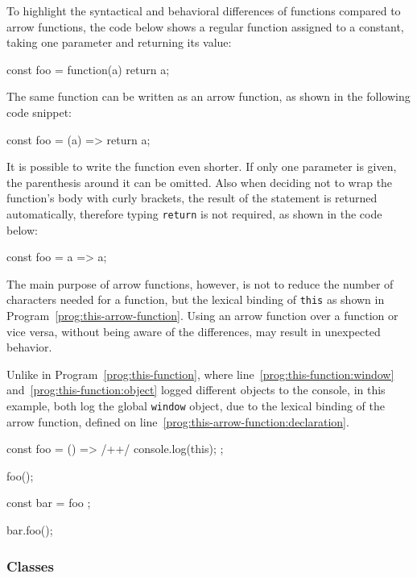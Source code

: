 To highlight the syntactical and behavioral differences of functions compared to arrow functions, the code below shows a regular function assigned to a constant, taking one parameter and returning its value:
\begin{JsCode}[numbers=none]
const foo = function(a) {
  return a;
}
\end{JsCode}
The same function can be written as an arrow function, as shown in the following code snippet:
\begin{JsCode}[numbers=none]
const foo = (a) => {
  return a;
}
\end{JsCode}
It is possible to write the function even shorter. If only one parameter is given, the parenthesis around it can be omitted. Also when deciding not to wrap the function's body with curly brackets, the result of the statement is returned automatically, therefore typing \texttt{return} is not required, as shown in the code below:
\begin{JsCode}[numbers=none]
const foo = a => a;
\end{JsCode}
The main purpose of arrow functions, however, is not to reduce the number of characters needed for a function, but the lexical binding of \texttt{this} as shown in Program~\ref{prog:this-arrow-function}. Using an arrow function over a function or vice versa, without being aware of the differences, may result in unexpected behavior.
\begin{program}
\caption{Unlike in Program~\ref{prog:this-function}, where line~\ref{prog:this-function:window} and~\ref{prog:this-function:object} logged different objects to the console, in this example, both log the global \texttt{window} object, due to the lexical binding of the arrow function, defined on line~\ref{prog:this-arrow-function:declaration}.}
\label{prog:this-arrow-function}
\begin{JsCode}
const foo = () => { /+\label{prog:this-arrow-function:declaration}+/
  console.log(this);
};

foo();

const bar = { foo };

bar.foo();
\end{JsCode}
\end{program}

\subsubsection{Classes}

